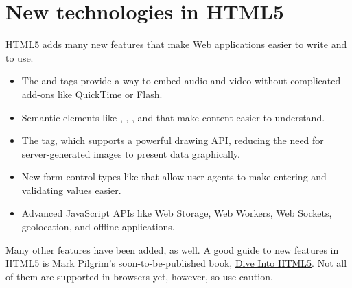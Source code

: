 \documentclass[a4paper,12pt]{sphinxmanual}
\begin{document}
\section{New technologies in HTML5}
\label{htmlfaq:new-technologies-in-html5}
HTML5 adds many new features that make Web applications easier to write
and to use.
\begin{itemize}
\item {} 
The  and  tags provide a way to embed audio and
video without complicated add-ons like QuickTime or Flash.

\item {} 
Semantic elements like , , , and
 that make content easier to understand.

\item {} 
The  tag, which supports a powerful drawing API, reducing
the need for server-generated images to present data graphically.

\item {} 
New form control types like  that allow user
agents to make entering and validating values easier.

\item {} 
Advanced JavaScript APIs like Web Storage, Web Workers, Web Sockets,
geolocation, and offline applications.

\end{itemize}

Many other features have been added, as well. A good guide to new features
in HTML5 is Mark Pilgrim's soon-to-be-published book, \href{http://www.diveintohtml5.org/}{Dive Into HTML5}.
Not all of them are supported in browsers yet, however, so use caution.
\end{document}

